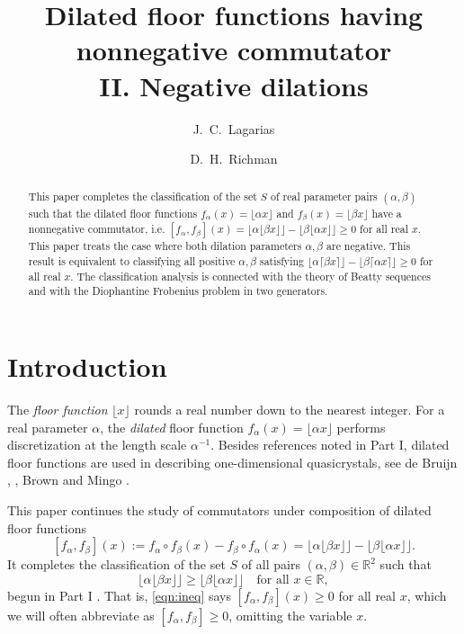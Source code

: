 \documentclass[11pt, letterpaper, reqno]{amsart}
\title[Dilated floor functions having nonnegative commutator II.]
{Dilated floor functions having nonnegative commutator\\
II. Negative dilations}
\author{J.\ C.\ Lagarias}
\author{D.\ H.\ Richman}
\theoremstyle{definition}
\theoremstyle{remark}
\numberwithin{equation}{section}
\newcommand{\RR}{\ensuremath{\mathbb{R}}}
\newcommand{\floor}[1]{\lfloor{#1}\rfloor}
\newcommand{\ceil}[1]{\lceil{#1}\rceil}
\begin{document}
\begin{abstract}
This paper completes the classification of  the set $S$ of real parameter pairs $(\alpha,\beta)$  
such that the dilated floor functions 
$f_\alpha(x) = \floor{\alpha x}$ and $f_\beta(x) = \floor{\beta x}$ have a nonnegative commutator, i.e.
$ [ f_{\alpha}, f_{\beta}](x) = \floor{\alpha \floor{\beta x}} -  \floor{\beta \floor{\alpha  x}} \geq 0$
for all real $x$.
This paper treats the case where 
both dilation parameters $\alpha, \beta$ are negative.
This result is equivalent to 
classifying all positive $\alpha, \beta$ satisfying
$ \floor{\alpha \ceil{\beta x}} -  \floor{\beta \ceil{\alpha  x}} \geq 0$
for all real $x$.
The classification analysis  is connected with 
the theory of Beatty sequences and with the Diophantine Frobenius problem in two generators.
\end{abstract}

\maketitle

\setcounter{tocdepth}{1}




\section{Introduction}
The {\em floor function}  
$\lfloor x \rfloor$
rounds a real number down to the nearest integer.
For  a real parameter $\alpha$,   the 
{\em dilated} floor function $f_\alpha(x)= \floor{\alpha x}$ performs discretization at the length scale $\alpha^{-1}$. 
Besides references noted in Part I, dilated floor functions are used  in describing
one-dimensional quasicrystals, see de Bruijn \cite[Sect. 4]{deB81}, \cite{deB89}, Brown \cite{Brown:1993} 
and Mingo \cite{Mingo00}. 


This paper continues the study  of commutators
under composition of dilated floor functions 
$$ 
[f_{\alpha}, f_{\beta}](x) 
:= f_{\alpha} \circ f_{\beta}(x) - f_{\beta} \circ f_{\alpha}(x) 
= \floor{\alpha \floor{\beta x}} - \floor{\beta \floor{\alpha x}}.
$$
It  completes  the classification 
of the set $S$ of all pairs $(\alpha, \beta) \in \RR^2$ such that
\begin{equation}\label{eqn:ineq} 
\floor{\alpha \floor{\beta x}} \geq \floor{\beta \floor{\alpha x}} \quad\text{for all }x\in\RR,
\end{equation}
begun in Part I \cite{LagR:2018a}. 
That is, \eqref{eqn:ineq} says  $[f_{\alpha}, f_{\beta}](x) \ge 0$ for all real $x$, which we will often abbreviate 
as $[f_{\alpha}, f_{\beta}]\ge 0$,  omitting  the variable $x$.
 
\end{document}
